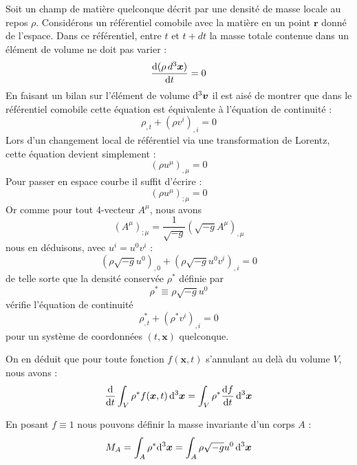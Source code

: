 			Soit un champ de matière quelconque décrit par une densité de masse locale au repos $\rho$. Considérons un référentiel comobile avec la matière en un point $\bm{r}$ donné de l'espace. Dans ce référentiel, entre $t$ et $t+dt$ la masse totale contenue dans un élément de volume ne doit pas varier :
			\begin{equation}
				\frac{\mathrm{d}(\rho \, d^3\bm{x})}{\mathrm{d} t} = 0
			\end{equation}
			En faisant un bilan sur l'élément de volume $\mathrm{d}^3\bm{v}$ il est aisé de montrer que dans le référentiel comobile cette équation est équivalente à l'équation de continuité :
			\begin{equation}
				\rho_{,t} + (\rho v^i)_{,i} = 0		
			\end{equation}	
			Lors d'un changement local de référentiel via une transformation de Lorentz, cette équation devient simplement :
			\begin{equation}
				(\rho u^\mu)_{,\mu}=0
			\end{equation}
			Pour passer en espace courbe il suffit d'écrire :
			\begin{equation}
				(\rho u^\mu)_{;\mu}=0
			\end{equation}
			Or comme pour tout 4-vecteur $A^\mu$, nous avons 
			\begin{equation}
				(A^\mu)_{;\mu}=\frac{1}{\sqrt{-g}}(\sqrt{-g}A^\mu)_{,\mu}
			\end{equation}
			nous en déduisons, avec $u^i=u^0v^i$ :
			\begin{equation}
				(\rho\sqrt{-g}u^0)_{,0}+(\rho\sqrt{-g}u^0v^i)_{,i}=0
			\end{equation}
			de telle sorte que la densité conservée $\rho^*$ définie par
			\begin{equation}
				\rho^*\equiv \rho \sqrt{-g}u^0
			\end{equation}
			vérifie l'équation de continuité
			\begin{equation}
				\rho^*_{,t}+(\rho^*v^i)_{,i}=0
			\end{equation}
			pour un système de coordonnées $(t,\bm{x})$ quelconque.

			On en déduit que pour toute fonction $f(\bm{x},t)$ s'annulant au delà du volume $V$, nous avons :
			\begin{equation}
				\frac{\mathrm{d}}{\mathrm{d} t} \int_V \rho^* f(\bm{x},t) \, \mathrm{d}^3\bm{x} = \int_V \rho^* \frac{\mathrm{d} f}{\mathrm{d} t} \,\mathrm{d}^3\bm{x} 
			\end{equation}

			En posant $f\equiv 1$ nous pouvons définir la masse invariante d'un corps $A$ :
			\begin{equation}
				M_A = \int_A \rho^* \mathrm{d}^3\bm{x} = \int_A \rho \sqrt{-g} u^0 \, \mathrm{d}^3\bm{x}
			\end{equation}

